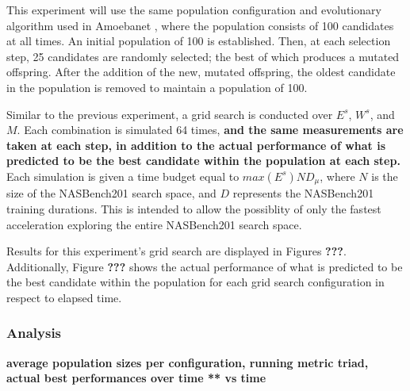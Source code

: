 \documentclass[twocolumn]{article}
\begin{document}
This experiment will use the same population configuration and evolutionary algorithm used in Amoebanet \cite{amoebanet}, where the population consists of 100 candidates at all times.
An initial population of 100 is established.
Then, at each selection step, 25 candidates are randomly selected; the best of which produces a mutated offspring.
After the addition of the new, mutated offspring, the oldest candidate in the population is removed to maintain a population of 100.

Similar to the previous experiment, a grid search is conducted over $E^s$, $W^s$, and $M$.
Each combination is simulated 64 times, \textbf{and the same measurements are taken at each step, in addition to the actual performance of what is predicted to be the
best candidate within the population at each step.}
Each simulation is given a time budget equal to $max(E^{s})ND_{\mu}$, where $N$ is the size of the NASBench201 search space, and $D$ represents the NASBench201 training durations.
This is intended to allow the possiblity of only the fastest acceleration exploring the entire NASBench201 search space.

Results for this experiment's grid search are displayed in Figures \textbf{???}. 
Additionally, Figure \textbf{???} shows the actual performance of what is predicted to be the best candidate within the population for each grid search configuration
in respect to elapsed time.

\subsubsection{Analysis}





\textbf{average population sizes per configuration, running metric triad, actual best performances over time ** vs time}
\end{document}
